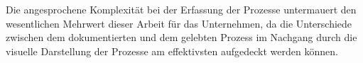 \documentclass[a4paper,12pt]{report}
\begin{document}
Die angesprochene Komplexität bei der Erfassung der Prozesse untermauert den wesentlichen Mehrwert dieser Arbeit für das Unternehmen, da die Unterschiede zwischen dem dokumentierten und dem gelebten Prozess im Nachgang durch die visuelle Darstellung der Prozesse am effektivsten aufgedeckt werden können.
\end{document}
